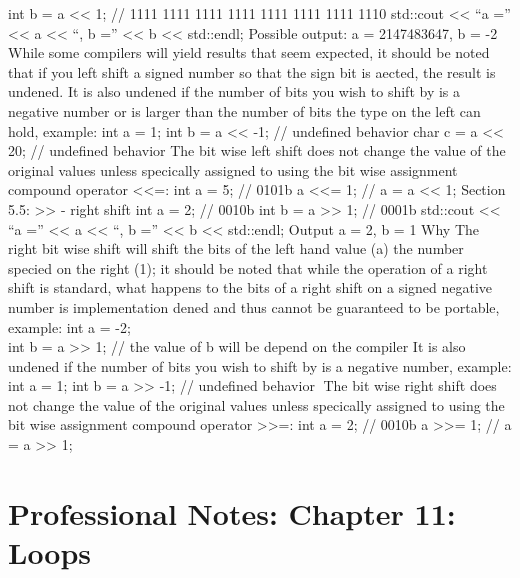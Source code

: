 int b = a \textless\textless{} 1; // 1111 1111 1111 1111 1111 1111 1111
1110 std::cout \textless\textless{} ``a ='' \textless\textless{} a
\textless\textless{} ``, b ='' \textless\textless{} b
\textless\textless{} std::endl; Possible output: a = 2147483647, b = -2
While some compilers will yield results that seem expected, it should be
noted that if you left shift a signed number so that the sign bit is
aected, the result is undened. It is also undened if the number of bits
you wish to shift by is a negative number or is larger than the number
of bits the type on the left can hold, example: int a = 1; int b = a
\textless\textless{} -1; // undefined behavior char c = a
\textless\textless{} 20; // undefined behavior The bit wise left shift
does not change the value of the original values unless specically
assigned to using the bit wise assignment compound operator
\textless\textless=: int a = 5; // 0101b a \textless\textless= 1; // a =
a \textless\textless{} 1; Section 5.5: \textgreater\textgreater{} -
right shift int a = 2; // 0010b int b = a \textgreater\textgreater{} 1;
// 0001b std::cout \textless\textless{} ``a ='' \textless\textless{} a
\textless\textless{} ``, b ='' \textless\textless{} b
\textless\textless{} std::endl; Output a = 2, b = 1 Why The right bit
wise shift will shift the bits of the left hand value (a) the number
specied on the right (1); it should be noted that while the operation of
a right shift is standard, what happens to the bits of a right shift on
a signed negative number is implementation dened and thus cannot be
guaranteed to be portable, example: int a = -2;\\
int b = a \textgreater\textgreater{} 1; // the value of b will be depend
on the compiler It is also undened if the number of bits you wish to
shift by is a negative number, example: int a = 1; int b = a
\textgreater\textgreater{} -1; // undefined behavior The bit wise right
shift does not change the value of the original values unless specically
assigned to using the bit wise assignment compound operator
\textgreater\textgreater=: int a = 2; // 0010b a
\textgreater\textgreater= 1; // a = a \textgreater\textgreater{} 1;

\hypertarget{professional-notes-chapter-11-loops}{%
\chapter{Professional Notes: Chapter 11:
Loops}\label{professional-notes-chapter-11-loops}}

